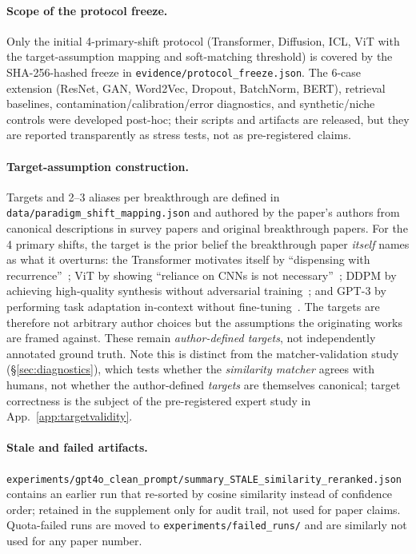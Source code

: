 \documentclass[11pt]{article}
\newcommand{\fpath}[1]{\mbox{}\nolinkurl{#1}}
\begin{document}
\paragraph{Scope of the protocol freeze.} Only the initial 4-primary-shift protocol (Transformer, Diffusion, ICL, ViT with the target-assumption mapping and soft-matching threshold) is covered by the SHA-256-hashed freeze in \texttt{evidence/protocol\_freeze.json}. The 6-case extension (ResNet, GAN, Word2Vec, Dropout, BatchNorm, BERT), retrieval baselines, contamination/calibration/error diagnostics, and synthetic/niche controls were developed post-hoc; their scripts and artifacts are released, but they are reported transparently as stress tests, not as pre-registered claims.

\paragraph{Target-assumption construction.} Targets and 2--3 aliases per breakthrough are defined in \texttt{data/paradigm\_shift\_mapping.json} and authored by the paper's authors from canonical descriptions in survey papers and original breakthrough papers. For the 4 primary shifts, the target is the prior belief the breakthrough paper \emph{itself} names as what it overturns: the Transformer motivates itself by ``dispensing with recurrence''~\cite{vaswani2017attention}; ViT by showing ``reliance on CNNs is not necessary''~\cite{dosovitskiy2021image}; DDPM by achieving high-quality synthesis without adversarial training~\cite{ho2020denoising}; and GPT-3 by performing task adaptation in-context without fine-tuning~\cite{brown2020language}. The targets are therefore not arbitrary author choices but the assumptions the originating works are framed against. These remain \emph{author-defined targets}, not independently annotated ground truth. Note this is distinct from the matcher-validation study (\S\ref{sec:diagnostics}), which tests whether the \emph{similarity matcher} agrees with humans, not whether the author-defined \emph{targets} are themselves canonical; target correctness is the subject of the pre-registered expert study in App.~\ref{app:targetvalidity}.

\paragraph{Stale and failed artifacts.} \fpath{experiments/gpt4o_clean_prompt/summary_STALE_similarity_reranked.json} contains an earlier run that re-sorted by cosine similarity instead of confidence order; retained in the supplement only for audit trail, not used for paper claims. Quota-failed runs are moved to \fpath{experiments/failed_runs/} and are similarly not used for any paper number.
\end{document}
